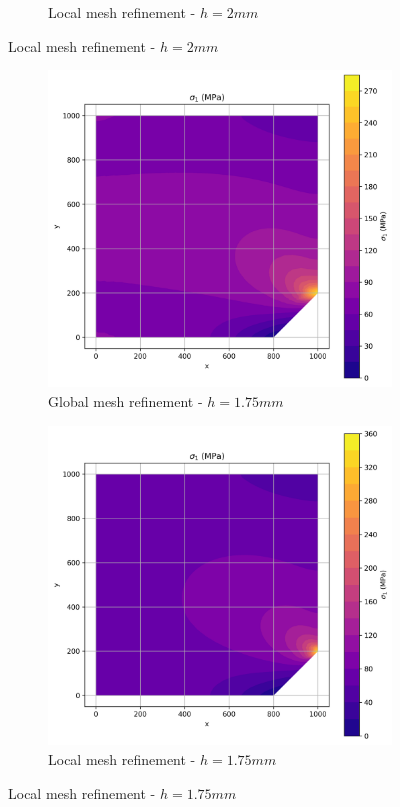 \begin{figure}[H]
\begin{subfigure}[b]{0.45\textwidth}
    \caption{Local mesh refinement - $h=2mm$}
    \label{fig:img2}
  \end{subfigure}
\end{figure}

\begin{figure}[H]
  \centering
  \begin{subfigure}[b]{0.45\textwidth}
    \centering
    \includegraphics[width=\textwidth]{GRAFICOS/Quad4/1.75mm_global/resultados - sigma_1.png}
    \caption{Global mesh refinement - $h=1.75mm$}
    \label{fig:img11}
  \end{subfigure}
  \hfill
  \begin{subfigure}[b]{0.45\textwidth}
    \centering
    \includegraphics[width=\textwidth]{GRAFICOS/Quad4/1.75mm_local/resultados - sigma_1.png}
    \caption{Local mesh refinement - $h=1.75mm$}
    \label{fig:img21}
  \end{subfigure}
\end{figure}

